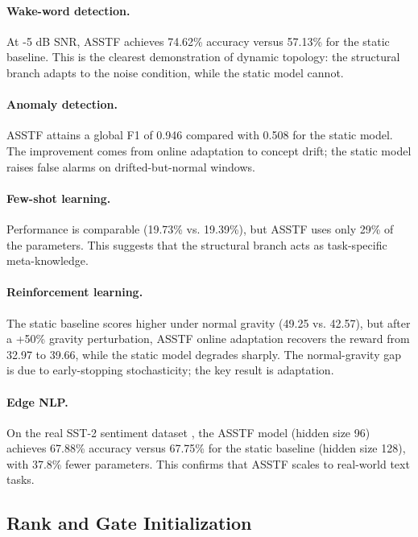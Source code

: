 \documentclass[11pt,a4paper]{article}
\theoremstyle{definition}
\begin{document}
\paragraph{Wake-word detection.} At -5 dB SNR, ASSTF achieves 74.62\% accuracy versus 57.13\% for the static baseline. This is the clearest demonstration of dynamic topology: the structural branch adapts to the noise condition, while the static model cannot.

\paragraph{Anomaly detection.} ASSTF attains a global F1 of 0.946 compared with 0.508 for the static model. The improvement comes from online adaptation to concept drift; the static model raises false alarms on drifted-but-normal windows.

\paragraph{Few-shot learning.} Performance is comparable (19.73\% vs.	19.39\%), but ASSTF uses only 29\% of the parameters. This suggests that the structural branch acts as task-specific meta-knowledge.

\paragraph{Reinforcement learning.} The static baseline scores higher under normal gravity (49.25 vs.	42.57), but after a +50\% gravity perturbation, ASSTF online adaptation recovers the reward from 32.97 to 39.66, while the static model degrades sharply. The normal-gravity gap is due to early-stopping stochasticity; the key result is adaptation.

\paragraph{Edge NLP.} On the real SST-2 sentiment dataset \cite{socher2013recursive}, the ASSTF model (hidden size 96) achieves 67.88\% accuracy versus 67.75\% for the static baseline (hidden size 128), with 37.8\% fewer parameters. This confirms that ASSTF scales to real-world text tasks.

\subsection{Rank and Gate Initialization}
\label{subsec:ablation}
\end{document}
